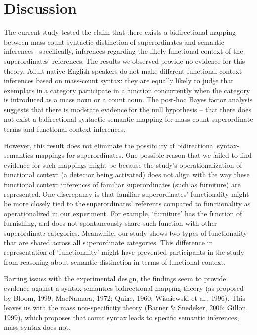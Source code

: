 \documentclass[
  man,floatsintext]{apa6}
\begin{document}
\hypertarget{discussion}{%
\section{Discussion}\label{discussion}}

The current study tested the claim that there exists a bidirectional mapping between mass-count syntactic distinction of superordinates and semantic inferences-- specifically, inferences regarding the likely functional context of the superordinates' references. The results we observed provide no evidence for this theory. Adult native English speakers do not make different functional context inferences based on mass-count syntax: they are equally likely to judge that exemplars in a category participate in a function concurrently when the category is introduced as a mass noun or a count noun. The post-hoc Bayes factor analysis suggests that there is moderate evidence for the null hypothesis -- that there does not exist a bidirectional syntactic-semantic mapping for mass-count superordinate terms and functional context inferences.

However, this result does not eliminate the possibility of bidirectional syntax-semantics mappings for superordinates. One possible reason that we failed to find evidence for such mappings might be because the study's operationalization of functional context (a detector being activated) does not align with the way these functional context inferences of familiar superordinates (such as furniture) are represented. One discrepancy is that familiar superordinates' functionality might be more closely tied to the superordinates' referents compared to functionality as operationalized in our experiment. For example, `furniture' has the function of furnishing, and does not spontaneously share such function with other superordinate categories. Meanwhile, our study shows two types of functionality that are shared across all superordinate categories. This difference in representation of `functionality' might have prevented participants in the study from reasoning about semantic distinction in terms of functional context.

Barring issues with the experimental design, the findings seem to provide evidence against a syntax-semantics bidirectional mapping theory (as proposed by Bloom, 1999; MacNamara, 1972; Quine, 1960; Wisniewski et al., 1996). This leaves us with the mass non-specificity theory (Barner \& Snedeker, 2006; Gillon, 1999), which proposes that count syntax leads to specific semantic inferences, mass syntax does not.
\end{document}
